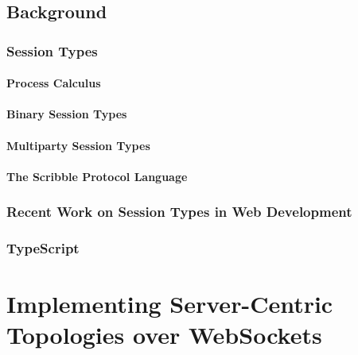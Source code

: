 \documentclass[12pt,twoside]{report}
\begin{document}





\renewcommand{\abstractname}{Acknowledgements}




\tableofcontents




\chapter{Background}

\section{Session Types}

\subsection{Process Calculus}
\subsection{Binary Session Types}
\subsection{Multiparty Session Types}
\subsection{The Scribble Protocol Language}

\section{Recent Work on Session Types in Web Development}

\section{TypeScript}

\part{Implementing Server-Centric Topologies over WebSockets}
\end{document}
